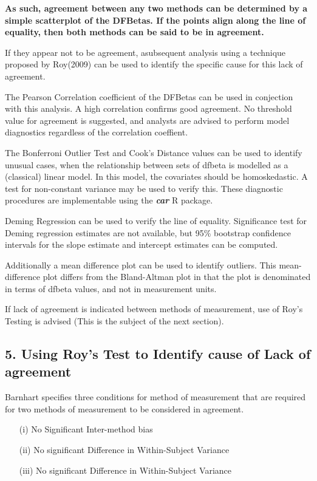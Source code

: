 \documentclass[Main.tex]{subfiles}
\begin{document}
\textbf{As such, agreement between any two methods can be determined by a simple scatterplot of the DFBetas. If the points align along the line of equality, then both methods can be said to be in agreement.}

If they appear not to be agreement, asubsequent analysis using a technique proposed by Roy(2009) can be used to identify the specific cause for this lack of agreement.

The Pearson Correlation coefficient of the DFBetas can be used in conjection with this analysis. A high correlation confirms good agreement. No threshold value for agreement is suggested, and analysts are advised to perform model diagnostics regardless of the correlation coeffient. 

The Bonferroni Outlier Test and Cook's Distance values can be used to identify unusual cases, when the relationship between sets of dfbeta is modelled as a (classical) linear model. In this model, the covariates should be homoskedastic. A test for non-constant variance may be used to verify this. These diagnostic procedures are implementable using the \textbf{\textit{car}} R package.
 
Deming Regression can be used to verify the line of equality. Significance test for Deming regression estimates are not available, but 95\% bootstrap confidence intervals for the slope estimate and intercept estimates can be computed. 


Additionally a mean difference plot can be used to identify outliers. This mean-difference plot differs from the Bland-Altman plot in that the plot is denominated in terms of dfbeta values, and not in measurement units.

If lack of agreement is indicated between methods of measurement, use of Roy's Testing is advised (This is the subject of the next section).
\subsection*{5. Using Roy's Test to Identify cause of Lack of agreement}

Barnhart specifies three conditions for method of measurement that are required for two methods of measurement to be considered in agreement.

\begin{itemize}
\item[(i)] No Significant Inter-method bias
\item[(ii)] No significant Difference in Within-Subject Variance
\item[(iii)] No significant Difference in Within-Subject Variance 
\end{itemize}
  
\end{document}
